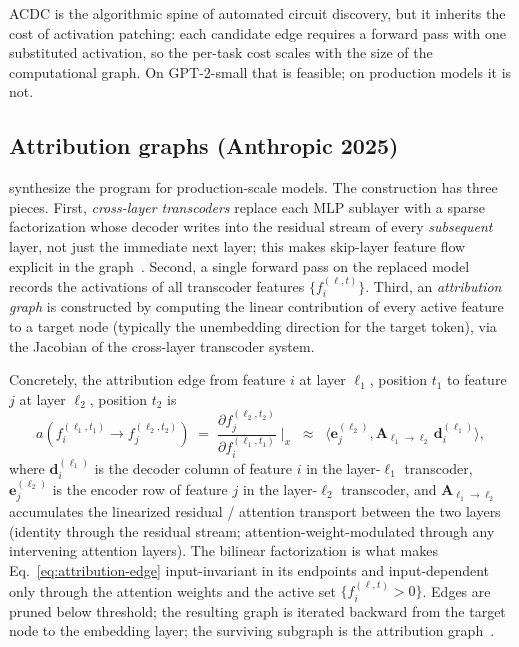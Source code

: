 ACDC is the algorithmic spine of automated circuit discovery, but it
inherits the cost of activation patching: each candidate edge requires
a forward pass with one substituted activation, so the per-task cost
scales with the size of the computational graph. On GPT-2-small that
is feasible; on production models it is not.

\subsection{Attribution graphs (Anthropic 2025)}
\label{sec:circuit-attribution}

\citet{lindsey2025-circuit-tracing} synthesize the program for
production-scale models. The construction has three pieces. First,
\emph{cross-layer transcoders} replace each MLP sublayer with a sparse
factorization whose decoder writes into the residual stream of every
\emph{subsequent} layer, not just the immediate next layer; this makes
skip-layer feature flow explicit in the
graph~\citep{dunefsky2024-transcoders}. Second, a single forward pass
on the replaced model records the activations of all transcoder
features $\{f_i^{(\ell, t)}\}$. Third, an \emph{attribution graph} is
constructed by computing the linear contribution of every active
feature to a target node (typically the unembedding direction for
the target token), via the Jacobian of the cross-layer transcoder
system.

Concretely, the attribution edge from feature $i$ at layer $\ell_1$,
position $t_1$ to feature $j$ at layer $\ell_2$, position $t_2$ is
\begin{equation}
  a\!\left(f_i^{(\ell_1, t_1)} \to f_j^{(\ell_2, t_2)}\right)
  \;=\;
  \frac{\partial f_j^{(\ell_2, t_2)}}{\partial f_i^{(\ell_1, t_1)}}
  \;\bigg|_{x}
  \;\;\approx\;\;
  \big\langle \mathbf{e}_j^{(\ell_2)},
              \mathbf{A}_{\ell_1 \to \ell_2}\,
              \mathbf{d}_i^{(\ell_1)} \big\rangle,
  \label{eq:attribution-edge}
\end{equation}
where $\mathbf{d}_i^{(\ell_1)}$ is the decoder column of feature $i$
in the layer-$\ell_1$ transcoder, $\mathbf{e}_j^{(\ell_2)}$ is the
encoder row of feature $j$ in the layer-$\ell_2$ transcoder, and
$\mathbf{A}_{\ell_1 \to \ell_2}$ accumulates the linearized residual /
attention transport between the two layers (identity through the
residual stream; attention-weight-modulated through any intervening
attention layers). The bilinear factorization is what makes
Eq.~\eqref{eq:attribution-edge} input-invariant in its endpoints and
input-dependent only through the attention weights and the active set
$\{f_i^{(\ell, t)} > 0\}$. Edges are pruned below threshold; the
resulting graph is iterated backward from the target node to the
embedding layer; the surviving subgraph is the attribution
graph~\citep{lindsey2025-circuit-tracing}.

